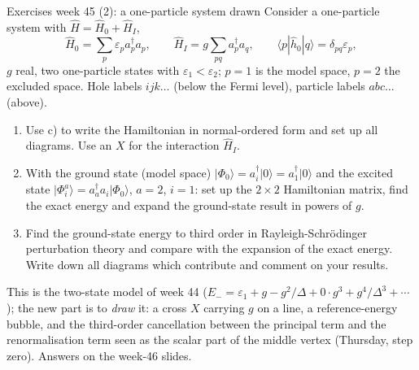 \documentclass[aspectratio=169,10pt]{beamer}
\newcommand{\mbbox}[1]{%
  \begin{tcolorbox}[colback=paleblue,colframe=uioblue,title={\bfseries Many-body connection}]
  #1
  \end{tcolorbox}}
\newcommand{\ket}[1]{\vert #1\rangle}
\begin{document}
\begin{frame}[shrink=8]{Exercises week 45 (2): a one-particle system drawn}
Consider a one-particle system with \(\hat H=\hat H_0+\hat H_I\),
\[
\hat H_0=\sum_p\varepsilon_pa^\dagger_pa_p,\qquad \hat H_I=g\sum_{pq}a^\dagger_pa_q,\qquad \langle p|\hat h_0|q\rangle=\delta_{pq}\varepsilon_p,
\]
\(g\) real, two one-particle states with \(\varepsilon_1<\varepsilon_2\); \(p=1\) is the model space, \(p=2\) the excluded space. Hole labels \(ijk\dots\) (below the Fermi level), particle labels \(abc\dots\) (above).
\begin{enumerate}
\item[e)] Use c) to write the Hamiltonian in normal-ordered form and set up all diagrams. Use an \(X\) for the interaction \(\hat H_I\).
\item[f)] With the ground state (model space) \(\ket{\Phi_0}=a^\dagger_i\ket{0}=a^\dagger_1\ket{0}\) and the excited state \(\ket{\Phi_i^a}=a^\dagger_aa_i\ket{\Phi_0}\), \(a=2\), \(i=1\): set up the \(2\times2\) Hamiltonian matrix, find the exact energy and expand the ground-state result in powers of \(g\).
\item[g)] Find the ground-state energy to third order in Rayleigh-Schr\"odinger perturbation theory and compare with the expansion of the exact energy. Write down all diagrams which contribute and comment on your results.
\end{enumerate}
\mbbox{This is the two-state model of week 44 (\(E_-=\varepsilon_1+g-g^2/\Delta+0\cdot g^3+g^4/\Delta^3+\cdots\)); the new part is to \emph{draw} it: a cross \(X\) carrying \(g\) on a line, a reference-energy bubble, and the third-order cancellation between the principal term and the renormalisation term seen as the scalar part of the middle vertex (Thursday, step zero). Answers on the week-46 slides.}
\end{frame}
\end{document}
